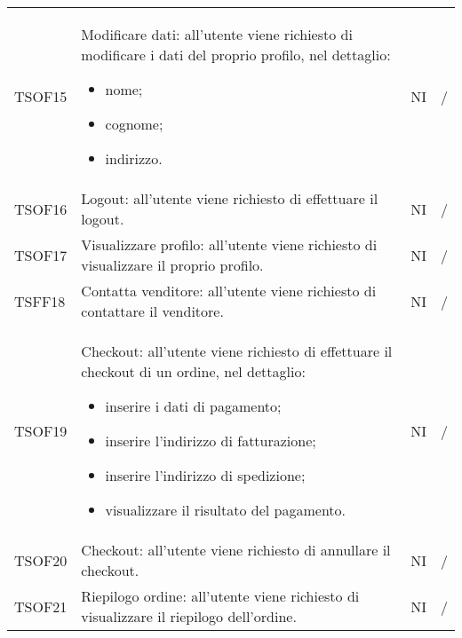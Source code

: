 \begin{center}
\begin{longtable}[!h]{p{60px} p{240px} p{35px} p{35px}}
        TSOF15                           & Modificare dati: all'utente viene richiesto di modificare i dati del proprio profilo, nel dettaglio: \begin{itemize} \item nome; \item cognome; \item indirizzo. \end{itemize}                                     & NI             & /             \\
        TSOF16                           & Logout: all'utente viene richiesto di effettuare il logout.                                                                                                         & NI             & /             \\
        TSOF17                           & Visualizzare profilo: all'utente viene richiesto di visualizzare il proprio profilo.                                                                                & NI             & /             \\
        TSFF18                           & Contatta venditore: all'utente viene richiesto di contattare il venditore.                                                                                          & NI             & /             \\
        TSOF19                           & Checkout: all'utente viene richiesto di effettuare il checkout di un ordine, nel dettaglio: \begin{itemize} \item inserire i dati di pagamento; \item inserire l'indirizzo di fatturazione; \item inserire l'indirizzo di spedizione; \item visualizzare il risultato del pagamento. \end{itemize}                                              & NI             & /             \\
        TSOF20                           & Checkout: all'utente viene richiesto di annullare il checkout.                                                                                                      & NI             & /             \\
        TSOF21                           & Riepilogo ordine: all'utente viene richiesto di visualizzare il riepilogo dell'ordine.                                                                              & NI             & /             \\

\end{longtable}
\end{center}
